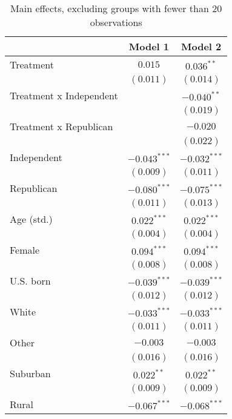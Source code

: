 
\begin{table}
\caption{Main effects, excluding groups with fewer than 20 observations}
\begin{center}
\begin{tabular}{l c c}
\toprule
 & Model 1 & Model 2 \\
\midrule
Treatment               & $0.015$        & $0.036^{**}$   \\
                        & $(0.011)$      & $(0.014)$      \\
Treatment x Independent &                & $-0.040^{**}$  \\
                        &                & $(0.019)$      \\
Treatment x Republican  &                & $-0.020$       \\
                        &                & $(0.022)$      \\
Independent             & $-0.043^{***}$ & $-0.032^{***}$ \\
                        & $(0.009)$      & $(0.011)$      \\
Republican              & $-0.080^{***}$ & $-0.075^{***}$ \\
                        & $(0.011)$      & $(0.013)$      \\
Age (std.)              & $0.022^{***}$  & $0.022^{***}$  \\
                        & $(0.004)$      & $(0.004)$      \\
Female                  & $0.094^{***}$  & $0.094^{***}$  \\
                        & $(0.008)$      & $(0.008)$      \\
U.S. born               & $-0.039^{***}$ & $-0.039^{***}$ \\
                        & $(0.012)$      & $(0.012)$      \\
White                   & $-0.033^{***}$ & $-0.033^{***}$ \\
                        & $(0.011)$      & $(0.011)$      \\
Other                   & $-0.003$       & $-0.003$       \\
                        & $(0.016)$      & $(0.016)$      \\
Suburban                & $0.022^{**}$   & $0.022^{**}$   \\
                        & $(0.009)$      & $(0.009)$      \\
Rural                   & $-0.067^{***}$ & $-0.068^{***}$ \\

\end{tabular}
\end{center}
\end{table}
